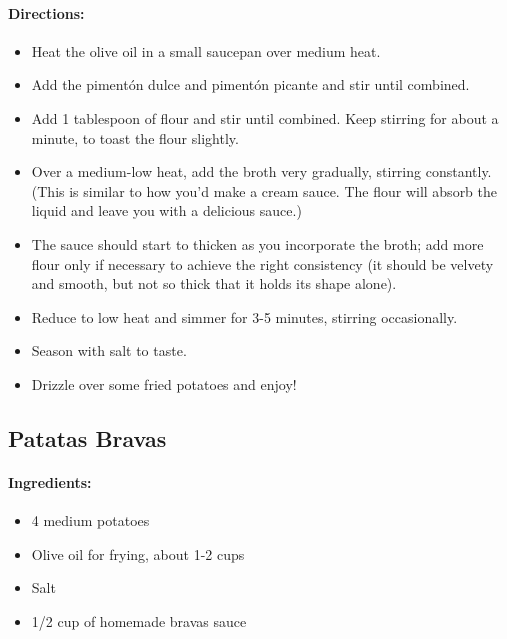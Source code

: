 \documentclass{article}
\begin{document}
\paragraph{Directions:}
\begin{itemize}
    \item Heat the olive oil in a small saucepan over medium heat.
    \item Add the pimentón dulce and pimentón picante and stir until combined.
    \item Add 1 tablespoon of flour and stir until combined. Keep stirring for about a minute, to toast the flour slightly.
    \item Over a medium-low heat, add the broth very gradually, stirring constantly. (This is similar to how you'd make a cream sauce. The flour will absorb the liquid and leave you with a delicious sauce.)
    \item The sauce should start to thicken as you incorporate the broth; add more flour only if necessary to achieve the right consistency (it should be velvety and smooth, but not so thick that it holds its shape alone).
    \item Reduce to low heat and simmer for 3-5 minutes, stirring occasionally.
    \item Season with salt to taste.
    \item Drizzle over some fried potatoes and enjoy!
\end{itemize}

\subsection{Patatas Bravas}

\paragraph{Ingredients:}
\begin{itemize}
    \item 4 medium potatoes
    \item Olive oil for frying, about 1-2 cups
    \item Salt
    \item 1/2 cup of homemade bravas sauce
\end{itemize}
\end{document}
